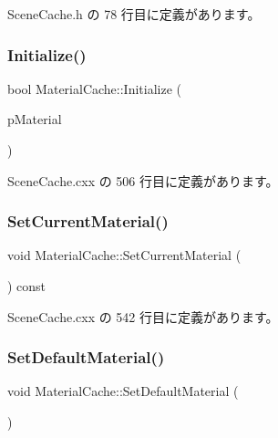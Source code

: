  Scene\+Cache.\+h の 78 行目に定義があります。

\mbox{\label{class_material_cache_a2f8d3d86af579091b7b719aa1db45a0d}} 
\subsubsection{\texorpdfstring{Initialize()}{Initialize()}}
{\footnotesize\ttfamily bool Material\+Cache\+::\+Initialize (\begin{DoxyParamCaption}\item[{const \hyperlink{class_fbx_surface_material}{Fbx\+Surface\+Material} $\ast$}]{p\+Material }\end{DoxyParamCaption})}



 Scene\+Cache.\+cxx の 506 行目に定義があります。

\mbox{\label{class_material_cache_a6de4c5a295159bbca83561749dfef223}} 
\subsubsection{\texorpdfstring{Set\+Current\+Material()}{SetCurrentMaterial()}}
{\footnotesize\ttfamily void Material\+Cache\+::\+Set\+Current\+Material (\begin{DoxyParamCaption}{ }\end{DoxyParamCaption}) const}



 Scene\+Cache.\+cxx の 542 行目に定義があります。

\mbox{\label{class_material_cache_a51881d2f46aa076ca4dfdce641e8fe1f}} 
\subsubsection{\texorpdfstring{Set\+Default\+Material()}{SetDefaultMaterial()}}
{\footnotesize\ttfamily void Material\+Cache\+::\+Set\+Default\+Material (\begin{DoxyParamCaption}{ }\end{DoxyParamCaption})\hspace{0.3cm}{\ttfamily [static]}}



